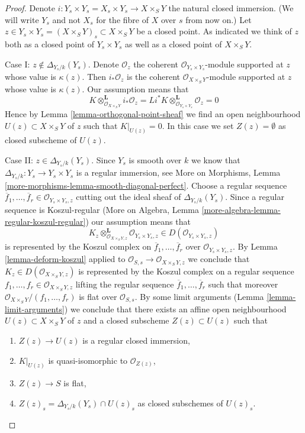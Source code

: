 \begin{proof}
Denote $i : Y_s \times Y_s = X_s \times Y_s \to X \times_S Y$
the natural closed immersion. (We will write $Y_s$ and not $X_s$
for the fibre of $X$ over $s$ from now on.) Let
$z \in Y_s \times Y_s = (X \times_S Y)_s \subset X \times_S Y$
be a closed point. As indicated we think of $z$ both as a closed point
of $Y_s \times Y_s$ as well as a closed point of $X \times_S Y$.

\medskip\noindent
Case I: $z \not \in \Delta_{Y_s/k}(Y_s)$. Denote $\mathcal{O}_z$
the coherent $\mathcal{O}_{Y_s \times Y_s}$-module supported at $z$
whose value is $\kappa(z)$. Then $i_*\mathcal{O}_z$ is the
coherent $\mathcal{O}_{X \times_S Y}$-module supported at $z$
whose value is $\kappa(z)$. Our assumption means that
$$
K \otimes_{\mathcal{O}_{X \times_S Y}}^\mathbf{L} i_*\mathcal{O}_z =
Li^*K \otimes_{\mathcal{O}_{Y_s \times Y_s}}^\mathbf{L} \mathcal{O}_z = 0
$$
Hence by Lemma \ref{lemma-orthogonal-point-sheaf}
we find an open neighbourhood $U(z) \subset X \times_S Y$ of $z$
such that $K|_{U(z)} = 0$. In this case we set $Z(z) = \emptyset$
as closed subscheme of $U(z)$.

\medskip\noindent
Case II: $z \in \Delta_{Y_s/k}(Y_s)$. Since $Y_s$ is smooth over $k$
we know that $\Delta_{Y_s/k} : Y_s \to Y_s \times Y_s$ is a
regular immersion, see More on Morphisms, Lemma
\ref{more-morphisms-lemma-smooth-diagonal-perfect}.
Choose a regular sequence $\overline{f}_1, \ldots, \overline{f}_r \in
\mathcal{O}_{Y_s \times Y_s, z}$ cutting out the ideal sheaf of
$\Delta_{Y_s/k}(Y_s)$. Since a regular sequence is Koszul-regular
(More on Algebra, Lemma \ref{more-algebra-lemma-regular-koszul-regular})
our assumption means that
$$
K_z \otimes_{\mathcal{O}_{X \times_S Y, z}}^\mathbf{L}
\mathcal{O}_{Y_s \times Y_s, z}
\in D(\mathcal{O}_{Y_s \times Y_s, z})
$$
is represented by the Koszul complex on
$\overline{f}_1, \ldots, \overline{f}_r$ over
$\mathcal{O}_{Y_s \times Y_s, z}$.
By Lemma \ref{lemma-deform-koszul} applied to
$\mathcal{O}_{S, s} \to \mathcal{O}_{X \times_S Y, z}$
we conclude that $K_z \in D(\mathcal{O}_{X \times_S Y, z})$ is
represented by the Koszul complex on a regular sequence
$f_1, \ldots, f_r \in \mathcal{O}_{X \times_S Y, z}$
lifting the regular sequence
$\overline{f}_1, \ldots, \overline{f}_r$
such that moreover $\mathcal{O}_{X \times_S Y}/(f_1, \ldots, f_r)$
is flat over $\mathcal{O}_{S, s}$.
By some limit arguments (Lemma \ref{lemma-limit-arguments})
we conclude that there exists an affine open neighbourhood
$U(z) \subset X \times_S Y$ of $z$ and a closed subscheme
$Z(z) \subset U(z)$ such that
\begin{enumerate}
\item $Z(z) \to U(z)$ is a regular closed immersion,
\item $K|_{U(z)}$ is quasi-isomorphic to $\mathcal{O}_{Z(z)}$,
\item $Z(z) \to S$ is flat,
\item $Z(z)_s = \Delta_{Y_s/k}(Y_s) \cap U(z)_s$
as closed subschemes of $U(z)_s$.
\end{enumerate}


\end{proof}
